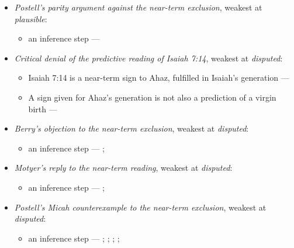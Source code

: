 \documentclass[11pt]{article}
\begin{document}
\begin{itemize}
\begin{itemize}
\item an inference step --- \cite[ad loc. Isa 7:14]{motyer-isaiah-1993}
\item an inference step --- \cite{miravalle-meet-your-mother-2014}
\item an inference step --- \cite{miravalle-introduction-mary-2020}
\item an inference step --- \cite[490--493]{postell-isaiah-messianic-2025}
\item an inference step --- \cite[ad loc. Matt 1:23]{france-matthew-2007}
\end{itemize}
\item \emph{Postell’s parity argument against the near-term exclusion}, weakest at \emph{plausible}:
\begin{itemize}
\item an inference step --- \cite[479--481]{postell-isaiah-messianic-2025}
\end{itemize}
\item \emph{Critical denial of the predictive reading of Isaiah 7:14}, weakest at \emph{disputed}:
\begin{itemize}
\item Isaiah 7:14 is a near-term sign to Ahaz, fulfilled in Isaiah’s generation --- \cite{brown-birth-messiah-1993}
\item A sign given for Ahaz’s generation is not also a prediction of a virgin birth --- \cite{brown-birth-messiah-1993}
\end{itemize}
\item \emph{Berry’s objection to the near-term exclusion}, weakest at \emph{disputed}:
\begin{itemize}
\item an inference step --- \cite[1653--1654]{berry-virgin-birth-2003}; \cite[5]{compton-immanuel-prophecy-2007}
\end{itemize}
\item \emph{Motyer’s reply to the near-term reading}, weakest at \emph{disputed}:
\begin{itemize}
\item an inference step --- \cite[124]{motyer-context-content-1970}; \cite[5]{compton-immanuel-prophecy-2007}
\end{itemize}
\item \emph{Postell’s Micah counterexample to the near-term exclusion}, weakest at \emph{disputed}:
\begin{itemize}
\item an inference step --- \cite[481]{postell-isaiah-messianic-2025}; \cite[ad loc. Mic 5:1]{rashi-commentary-prophets-1100}; \cite[ad loc. Mic 5:4]{rashi-commentary-prophets-1100}; \cite[ad loc. Isa 7:14]{rashi-commentary-prophets-1100}; \cite[ad loc. Isa 7:14]{ibn-ezra-commentary-isaiah-1145}
\end{itemize}
\end{itemize}
\end{document}
